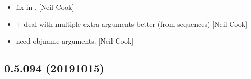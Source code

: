 \documentclass[a4paper,10pt,english]{report}
\begin{document}
\begin{itemize}
\item {} 
 \sphinxhyphen{} fix  in . {[}Neil Cook{]}

\item {} 
 +  \sphinxhyphen{} deal
with multiple extra arguments better (from sequences) {[}Neil Cook{]}

\item {} 
 \sphinxhyphen{}  need
objname arguments. {[}Neil Cook{]}

\end{itemize}


\subsection{0.5.094 (2019\sphinxhyphen{}10\sphinxhyphen{}15)}
\end{document}
